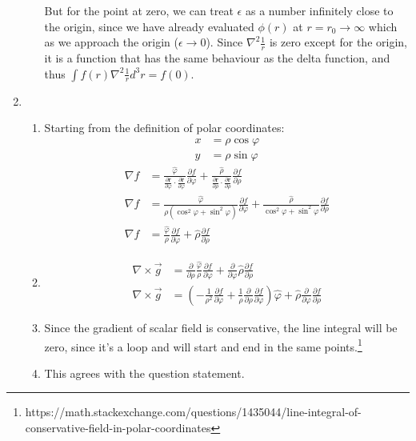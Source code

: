 \documentclass[12pt]{article}
\newcommand{\p}[2]{\frac{\partial #1}{\partial #2}}
\begin{document}
\begin{enumerate}
\begin{enumerate}
      But for the point at zero, we can treat $\epsilon$ as a number infinitely close to the origin, since we have already evaluated $\phi(r)$ at $r=r_0\rightarrow\infty$ which as we approach the origin ($\epsilon\rightarrow0$).
      Since $\nabla^2\frac{1}{r}$ is zero except for the origin, it is a function that has the same behaviour as the delta function, and thus $\int f(r)\nabla^2\frac{1}{r}d^3r=f(0)$.
    \end{enumerate}
    \item
    \begin{enumerate}
      \item Starting from the definition of polar coordinates:
      \begin{align*}
        x&=\rho\cos\varphi\\
        y&=\rho\sin\varphi
      \end{align*}
      \begin{align*}
        \nabla f&=\frac{\hat{\varphi}}{\p{\pmb{r}}{\varphi}\cdot\p{\pmb{r}}{\varphi}}\p{f}{\varphi}+\frac{\hat{\rho}}{\p{\pmb{r}}{\rho}\cdot\p{\pmb{r}}{\rho}}\p{f}{\rho}\\
        \nabla f&=\frac{\hat{\varphi}}{\rho\left(\cos^2\varphi+\sin^2\varphi \right)}\p{f}{\varphi}+\frac{\hat{\rho}}{\cos^2\varphi+\sin^2\varphi}\p{f}{\rho}\\
        \nabla f&=\frac{\hat{\varphi}}{\rho}\p{f}{\varphi}+\hat{\rho}\p{f}{\rho}
      \end{align*}
      \item
      \begin{align*}
        \nabla\times\vec{g}&=\p{}{\rho}\frac{\hat{\varphi}}{\rho}\p{f}{\varphi}+\p{}{\varphi}\hat{\rho}\p{f}{\rho}\\
        \nabla\times\vec{g}&=\left(-\frac{1}{\rho^2}\p{f}{\varphi}+\frac{1}{\rho}\p{}{\rho}\p{f}{\varphi}\right)\hat{\varphi}+\hat{\rho}\p{}{\varphi}\p{f}{\rho}
      \end{align*}
      \item Since the gradient of scalar field is conservative, the line integral will be zero, since it's a loop and will start and end in the same points.\footnote{https://math.stackexchange.com/questions/1435044/line-integral-of-conservative-field-in-polar-coordinates}
      \item This agrees with the question statement.
    \end{enumerate}
  \end{enumerate}
\end{document}
